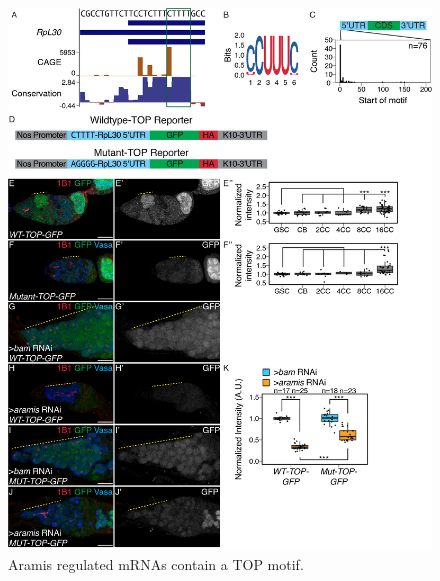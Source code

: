 \documentclass[12pt,oneside]{reedthesis}
\begin{document}
\begin{figure}

{\centering \includegraphics[width=6.5 in,height=8.9375 in]{./figure/Ribosome Biogenesis/Ribosome Biogenesis 6} 

}

\caption[Aramis regulated mRNAs contain a TOP motif.]{Aramis regulated mRNAs contain a TOP motif.}\label{fig:unnamed-chunk-16}
\end{figure}
\end{document}
